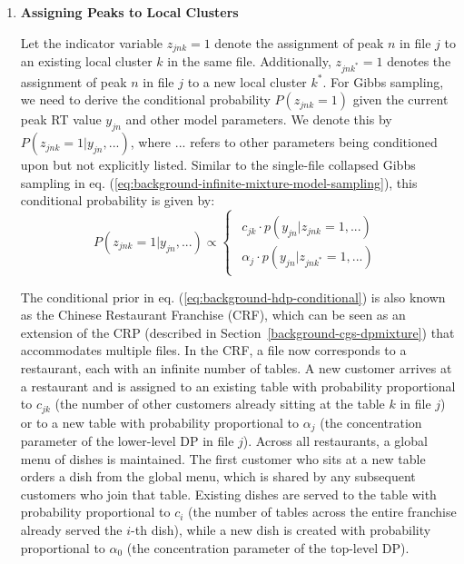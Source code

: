 \begin{enumerate}

\item \textbf{Assigning Peaks to Local Clusters}

Let the indicator variable $z_{jnk}=1$ denote the assignment of peak $n$ in file $j$ to an existing local cluster $k$ in the same file. Additionally, $z_{jnk^{*}}=1$ denotes the assignment of peak $n$ in file $j$ to a new local cluster $k^{*}$. For Gibbs sampling, we need to derive the conditional probability $P(z_{jnk}=1)$ given the current peak RT value $y_{jn}$ and other model parameters. We denote this by $P(z_{jnk}=1 \vert y_{jn}, ...)$, where $...$ refers to other parameters being conditioned upon but not explicitly listed. Similar to the single-file collapsed Gibbs sampling in eq. (\ref{eq:background-infinite-mixture-model-sampling}), this conditional probability is given by:
\begin{dmath}
P(z_{jnk}=1 \vert y_{jn}, ...)\propto\begin{cases}
\begin{array}{c}
c_{jk}\cdot p(y_{jn} \vert z_{jnk}=1,...)\\
\alpha_{j}\cdot p(y_{jn} \vert z_{jnk^{*}}=1,...)
\end{array}\end{cases}\label{eq:background-hdp-conditional}
\end{dmath}

The conditional prior in eq. (\ref{eq:background-hdp-conditional}) is also known as the Chinese Restaurant Franchise (CRF), which can be seen as an extension of the CRP (described in Section~\ref{background-cgs-dpmixture}) that accommodates multiple files. In the CRF, a file now corresponds to a restaurant, each with an infinite number of tables. A new customer arrives at a restaurant and is assigned to an existing table with probability proportional to $c_{jk}$ (the number of other customers already sitting at the table $k$ in file $j$) or to a new table with probability proportional to $\alpha_j$ (the concentration parameter of the lower-level DP in file $j$). Across all restaurants, a global menu of dishes is maintained. The first customer who sits at a new table orders a dish from the global menu, which is shared by any subsequent customers who join that table. Existing dishes are served to the table with probability proportional to $c_i$ (the number of tables across the entire franchise already served the $i$-th dish), while a new dish is created with probability proportional to $\alpha_0$ (the concentration parameter of the top-level DP).


\end{enumerate}
